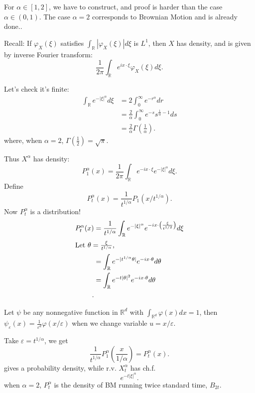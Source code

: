 
\begin{remark}
	For $\alpha \in [1,2]$, we have to construct, and proof is harder than the case $\alpha \in (0,1)$. The case $\alpha = 2$ corresponds to Brownian Motion and is already done..
\end{remark}

Recall: If $\varphi_X(\xi)$ satisfies $\int _{\mathbb{R}} |\varphi_X(\xi)| d \xi$ is $L^1$, then $X$ has density, and is given by inverse Fourier transform:
\[
	\frac{1}{2 \pi} \int _\mathbb{R} e^{ i x \cdot \xi} \varphi_X(\xi) d \xi
.\] 

Let's check it's finite:
\begin{align*}
	\int _\mathbb{R} e^{- |\xi|^\alpha} d \xi
	&= 2 \int _0^\infty e^{- r^\alpha} d r \\
	&= \frac{2}{\alpha} \int _0^\infty e^{-s} s^{\frac{1}{\alpha}-1}ds \\
	&= \frac{2}{\alpha}\Gamma(\frac{1}{\alpha}) 
.\end{align*}	
where, when $\alpha = 2$, $\Gamma(\frac{1}{2}) = \sqrt{\pi} $.

Thus $X^\alpha$ has density:
\[
	P_1^\alpha (x) = \frac{1}{2 \pi} \int _{\mathbb{R}} e^{ - i x \cdot \xi} e^{- |\xi|^\alpha} d \xi
.\] 
Define
\[
	P_t^\alpha (x) = \frac{1}{t^{1 / \alpha}} P_1(x / t^{1 / \alpha})
.\] 
Now $P_t^\alpha$ is a distribution!
\begin{align*}
	P_t^\alpha(x) &= \frac{1}{t^{1 /\alpha}} \int _{\mathbb{R}} e^{- |\xi|^\alpha} e^{- i x \cdot \left( \frac{\xi}{t^{1 / 2}} \right) }d \xi\\
	\intertext{Let $\theta = \frac{\xi}{t^{1 / \alpha}}$,}
	&= \int _\mathbb{R} e^{- |t^{1 / \alpha} \theta|} e^{- i x \cdot \theta} d \theta \\
	&= \int _\mathbb{R} e^{- t| \theta|^{2}} e^{- i x \cdot \theta} d \theta \\
.\end{align*}

Let $\psi$ be any nonnegative function in $\mathbb{R}^d$ with $\int _{\mathbb{R}^d} \varphi(x) dx = 1$, then $\psi_\varepsilon(x) = \frac{1}{\varepsilon^d} \varphi(x / \varepsilon)$ when we change variable $u = x / \varepsilon$.

Take $\varepsilon = t^{1 / \alpha}$, we get
\[
	\frac{1}{t^{1 / \alpha}} P_1^\alpha \left(\frac{x}{1 / \alpha}\right) = P_t^\alpha(x)
.\] 
gives a probability density, while r.v. $X_t^\alpha$ has ch.f. 
\[
	e^{- t |\xi|^\alpha}
.\] 
when $\alpha = 2$, $P_t^\alpha$ is the density of BM running twice standard time, $B_{2 t}$.

